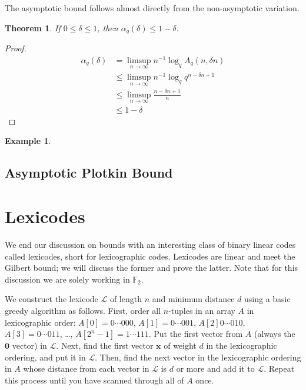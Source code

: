 \documentclass{article}
\newtheorem{theorem}{Theorem}
\numberwithin{theorem}{subsection}
\numberwithin{lemma}{subsection}
\theoremstyle{definition}
\newtheorem{exmp}{Example}
\numberwithin{exmp}{subsection}
\theoremstyle{definition}
\numberwithin{defn}{subsection}
\theoremstyle{definition}
\numberwithin{claim}{subsection}
\begin{document}
The asymptotic bound follows almost directly from the non-asymptotic variation.

\begin{theorem}
If $0 \le \delta \le 1$, then $\alpha_q(\delta) \le 1 - \delta$.
\end{theorem} 


\begin{proof}
\begin{equation} 
\begin{split}
\alpha_{q}(\delta) & = \limsup_{n \to \infty} n^{-1} \log_q A_q(n,\delta n) \\
& \le \limsup_{n \to \infty} n^{-1} \log_q q^{n-\delta n+1} \\
& \le \limsup_{n \to \infty} \frac{n-\delta n+1}{n} \\
& \le 1 - \delta
\end{split}
\end{equation}
\end{proof}


\begin{exmp}

\end{exmp}


\subsection{Asymptotic Plotkin Bound}

\section{Lexicodes}
We end our discussion on bounds with an interesting class of binary linear codes
called lexicodes, short for lexicographic codes.  Lexicodes are linear and meet the Gilbert bound; we will discuss the former and prove the latter.  Note that for this discussion we are 
solely working in $\mathbb{F}_2$.

We construct the lexicode $\mathcal{L}$ of length $n$ and minimum distance $d$ using a basic greedy algorithm as follows.  First, order all $n$-tuples in an array $A$ in lexicographic order:
$A[0] = 0\cdots000$, $A[1]=0\cdots001$, $A[2]0\cdots010$, $A[3]=0\cdots011$, \ldots, $A[2^n-1] = 1\cdots111$.  Put the first vector from  $A$ (always the $\mathbf{0}$ vector) in $\mathcal{L}$.  Next, find the first vector $\mathbf{x}$
of weight $d$ in the lexicographic ordering, and put it in $\mathcal{L}$.  Then, find the next vector in the lexicographic ordering in $A$ whose distance from each vector in $\mathcal{L}$ is 
$d$ or more and add it to $\mathcal{L}$.  Repeat this process until you have scanned through all of $A$ once.
\end{document}

